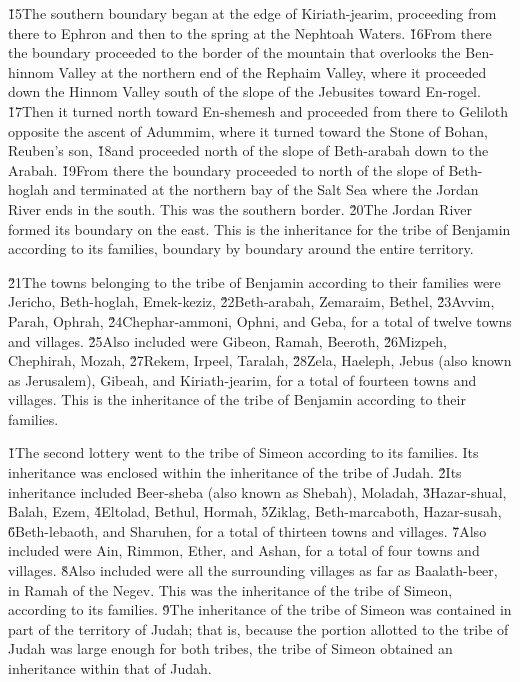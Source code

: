 \v{15}The southern boundary began at the edge of Kiriath-jearim, proceeding from there to Ephron and then to the spring at the Nephtoah Waters. \v{16}From there the boundary proceeded to the border of the mountain that overlooks the Ben-hinnom Valley at the northern end of the Rephaim Valley, where it proceeded down the Hinnom Valley south of the slope of the Jebusites toward En-rogel. \v{17}Then it turned north toward En-shemesh and proceeded from there to Geliloth opposite the ascent of Adummim, where it turned toward the Stone of Bohan, Reuben's son, \v{18}and proceeded north of the slope of Beth-arabah down to the Arabah. \v{19}From there the boundary proceeded to north of the slope of Beth-hoglah and terminated at the northern bay of the Salt Sea where the Jordan River ends in the south. This was the southern border. \v{20}The Jordan River formed its boundary on the east. This is the inheritance for the tribe of Benjamin according to its families, boundary by boundary around the entire territory.

\v{21}The towns belonging to the tribe of Benjamin according to their families were Jericho, Beth-hoglah, Emek-keziz, \v{22}Beth-arabah, Zemaraim, Bethel, \v{23}Avvim, Parah, Ophrah, \v{24}Chephar-ammoni, Ophni, and Geba, for a total of twelve towns and villages. \v{25}Also included were Gibeon, Ramah, Beeroth, \v{26}Mizpeh, Chephirah, Mozah, \v{27}Rekem, Irpeel, Taralah, \v{28}Zela, Haeleph, Jebus (also known as Jerusalem), Gibeah, and Kiriath-jearim, for a total of fourteen towns and villages. This is the inheritance of the tribe of Benjamin according to their families.

\v{1}The second lottery went to the tribe of Simeon according to its families. Its inheritance was enclosed within the inheritance of the tribe of Judah. \v{2}Its inheritance included Beer-sheba (also known as Shebah), Moladah, \v{3}Hazar-shual, Balah, Ezem, \v{4}Eltolad, Bethul, Hormah, \v{5}Ziklag, Beth-marcaboth, Hazar-susah, \v{6}Beth-lebaoth, and Sharuhen, for a total of thirteen towns and villages. \v{7}Also included were Ain, Rimmon, Ether, and Ashan, for a total of four towns and villages. \v{8}Also included were all the surrounding villages as far as Baalath-beer, in Ramah of the Negev. This was the inheritance of the tribe of Simeon, according to its families. \v{9}The inheritance of the tribe of Simeon was contained in part of the territory of Judah; that is, because the portion allotted to the tribe of Judah was large enough for both tribes, the tribe of Simeon obtained an inheritance within that of Judah.

